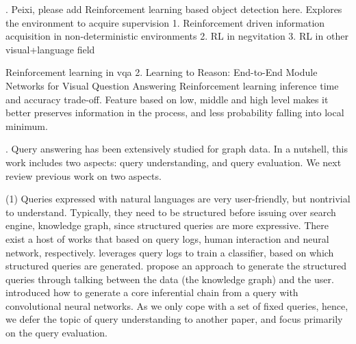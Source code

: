 . {\color{red} Peixi, please add Reinforcement learning based object detection here.} 
Explores the environment to acquire supervision
1. Reinforcement driven information acquisition in non-deterministic environments
2. RL in negvitation
3. RL in other visual+language field

Reinforcement learning in vqa 
2. Learning to Reason: End-to-End Module Networks for Visual Question Answering
Reinforcement learning inference time and accuracy trade-off. Feature based on low, middle and high level makes it better preserves information in the process, and less probability falling into local minimum.



. Query answering has been extensively studied for graph data. In a nutshell, this work includes two aspects: query understanding, and query evaluation. We next review previous work on two aspects. 

\noindent (1) Queries expressed with natural languages are very user-friendly, but nontrivial to understand. Typically, they need to be structured before issuing over \eg search engine, knowledge graph, since structured queries are more expressive. There exist a host of works that based on query logs, human interaction and neural network, respectively. \cite{PoundHIW12} leverages query logs to train a classifier, based on which structured queries are generated.  \cite{ZhengC0YZ17} propose an approach to generate the structured queries through talking between the data (\ie the knowledge graph) and the user. \cite{YihCHG15} introduced how to generate a core inferential chain from a query with convolutional neural networks. As we only cope with a set of fixed queries, hence, we defer
the topic of query understanding to another paper, and focus primarily on the query evaluation. 

